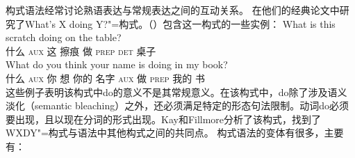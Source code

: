 构式语法经常讨论熟语表达与常规表达之间的互动关系。 \citet{KF99a}在他们的经典论文中研究了What's X doing Y?"=构式。（）包含这一构式的一些实例：
\eal
\ex 
\gll What is this scratch doing on the table?\\
      什么 \textsc{aux} 这 擦痕 做 \textsc{prep} \textsc{det} 桌子\\
\ex 
\gll What do you think your name is doing in my book?\\
      什么 \textsc{aux} 你 想 你的 名字 \textsc{aux} 做 \textsc{prep} 我的 书\\
\zl
这些例子表明该构式中do的意义不是其常规意义。在该构式中，do除了涉及语义淡化（semantic bleaching）之外，还必须满足特定的形态句法限制。动词do必须要出现，且以现在分词的形式出现。Kay和Fillmore分析了该构式，找到了WXDY"=构式与语法中其他构式之间的共同点。
构式语法的变体有很多，主要有：
